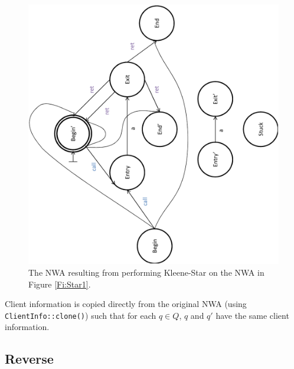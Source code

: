 \begin{figure}[p]
  \centering
    \includegraphics[width=12cm]{Figures/Figure12}
  \caption{The NWA resulting from performing Kleene-Star on the NWA in Figure \ref{Fi:Star1}.}
  \label{Fi:Star2}
\end{figure}

\goodbreak Client information is copied directly from the original NWA (using
\texttt{ClientInfo::clone()}) such that for each $q \in Q$, $q$
and $q'$ have the same client information.




\subsection{Reverse}
\label{Se:Reverse}

